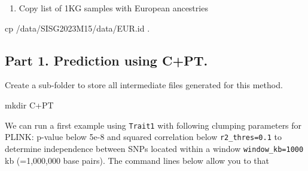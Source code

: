 \documentclass[
  letterpaper,
  DIV=11,
  numbers=noendperiod]{scrartcl}
\newenvironment{Shaded}{\begin{snugshade}}{\end{snugshade}}
\newcommand{\AttributeTok}[1]{\textcolor[rgb]{0.40,0.45,0.13}{#1}}
\newcommand{\CommentTok}[1]{\textcolor[rgb]{0.37,0.37,0.37}{#1}}
\newcommand{\DataTypeTok}[1]{\textcolor[rgb]{0.68,0.00,0.00}{#1}}
\newcommand{\FunctionTok}[1]{\textcolor[rgb]{0.28,0.35,0.67}{#1}}
\newcommand{\NormalTok}[1]{\textcolor[rgb]{0.00,0.23,0.31}{#1}}
\newcommand{\OperatorTok}[1]{\textcolor[rgb]{0.37,0.37,0.37}{#1}}
\newcommand{\VariableTok}[1]{\textcolor[rgb]{0.07,0.07,0.07}{#1}}
\providecommand{\tightlist}{%
  \setlength{\itemsep}{0pt}\setlength{\parskip}{0pt}}
\begin{document}
\begin{enumerate}
\def\labelenumi{\arabic{enumi})}
\setcounter{enumi}{4}
\tightlist
\item
  Copy list of 1KG samples with European ancestries
\end{enumerate}

\begin{Shaded}
\begin{Highlighting}[]
\FunctionTok{cp}\NormalTok{ /data/SISG2023M15/data/EUR.id .}
\end{Highlighting}
\end{Shaded}

\subsection{Part 1. Prediction using
C+PT.}\label{part-1.-prediction-using-cpt.}

Create a sub-folder to store all intermediate files generated for this
method.

\begin{Shaded}
\begin{Highlighting}[]
\FunctionTok{mkdir}\NormalTok{ C+PT}
\end{Highlighting}
\end{Shaded}

We can run a first example using \texttt{Trait1} with following clumping
parameters for PLINK: p-value below 5e-8 and squared correlation below
\texttt{r2\_thres=0.1} to determine independence between SNPs located
within a window \texttt{window\_kb=1000} kb (=1,000,000 base pairs). The
command lines below allow you to that

\begin{Shaded}
\end{Shaded}
\end{document}
